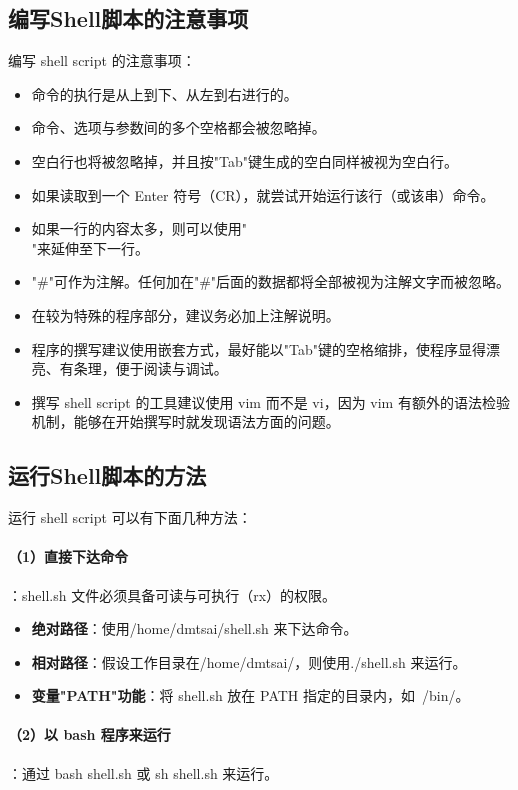 \documentclass[12pt,UTF8]{ctexbook}
\begin{document}
\subsection{编写Shell脚本的注意事项}
编写 shell script 的注意事项：
\begin{itemize}
    \item 命令的执行是从上到下、从左到右进行的。
    \item 命令、选项与参数间的多个空格都会被忽略掉。
    \item 空白行也将被忽略掉，并且按"Tab"键生成的空白同样被视为空白行。
    \item 如果读取到一个 Enter 符号（CR），就尝试开始运行该行（或该串）命令。
    \item 如果一行的内容太多，则可以使用"\\"来延伸至下一行。
    \item "#"可作为注解。任何加在"#"后面的数据都将全部被视为注解文字而被忽略。
    \item 在较为特殊的程序部分，建议务必加上注解说明。
    \item 程序的撰写建议使用嵌套方式，最好能以"Tab"键的空格缩排，使程序显得漂亮、有条理，便于阅读与调试。
    \item 撰写 shell script 的工具建议使用 vim 而不是 vi，因为 vim 有额外的语法检验机制，能够在开始撰写时就发现语法方面的问题。
\end{itemize}

\subsection{运行Shell脚本的方法}
运行 shell script 可以有下面几种方法：

\paragraph{（1）直接下达命令}：shell.sh 文件必须具备可读与可执行（rx）的权限。
\begin{itemize}
    \item \textbf{绝对路径}：使用/home/dmtsai/shell.sh 来下达命令。
    \item \textbf{相对路径}：假设工作目录在/home/dmtsai/，则使用./shell.sh 来运行。
    \item \textbf{变量"PATH"功能}：将 shell.sh 放在 PATH 指定的目录内，如~/bin/。
\end{itemize}

\paragraph{（2）以 bash 程序来运行}：通过 bash shell.sh 或 sh shell.sh 来运行。
\end{document}
